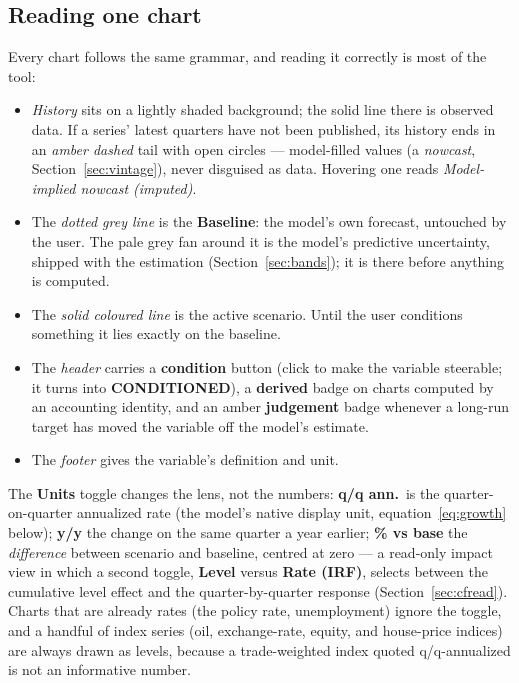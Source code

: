 \documentclass[11pt]{article}
\newcommand{\ui}[1]{\textbf{#1}}
\theoremstyle{plain}
\theoremstyle{remark}
\begin{document}
\subsection{Reading one chart}\label{sec:readchart}

Every chart follows the same grammar, and reading it correctly is most
of the tool:
\begin{itemize}
  \item \emph{History} sits on a lightly shaded background; the solid
    line there is observed data. If a series' latest quarters have not
    been published, its history ends in an \emph{amber dashed} tail with
    open circles --- model-filled values (a \emph{nowcast},
    Section~\ref{sec:vintage}), never disguised as data. Hovering one
    reads \emph{Model-implied nowcast (imputed)}.
  \item The \emph{dotted grey line} is the \ui{Baseline}: the model's
    own forecast, untouched by the user. The pale grey fan around it is
    the model's predictive uncertainty, shipped with the estimation
    (Section~\ref{sec:bands}); it is there before anything is computed.
  \item The \emph{solid coloured line} is the active scenario. Until the
    user conditions something it lies exactly on the baseline.
  \item The \emph{header} carries a \ui{condition} button (click to make
    the variable steerable; it turns into \ui{CONDITIONED}), a
    \ui{derived} badge on charts computed by an accounting identity, and
    an amber \ui{judgement} badge whenever a long-run target has moved
    the variable off the model's estimate.
  \item The \emph{footer} gives the variable's definition and unit.
\end{itemize}

The \ui{Units} toggle changes the lens, not the numbers:
\ui{q/q ann.}\ is the quarter-on-quarter annualized rate (the model's
native display unit, equation~\eqref{eq:growth} below); \ui{y/y} the
change on the same quarter a year earlier; \ui{\% vs base} the
\emph{difference} between scenario and baseline, centred at zero --- a
read-only impact view in which a second toggle, \ui{Level} versus
\ui{Rate (IRF)}, selects between the cumulative level effect and the
quarter-by-quarter response (Section~\ref{sec:cfread}). Charts that are
already rates (the policy rate, unemployment) ignore the toggle, and a
handful of index series (oil, exchange-rate, equity, and house-price
indices) are always drawn as levels, because a trade-weighted index
quoted q/q-annualized is not an informative number.
\end{document}
